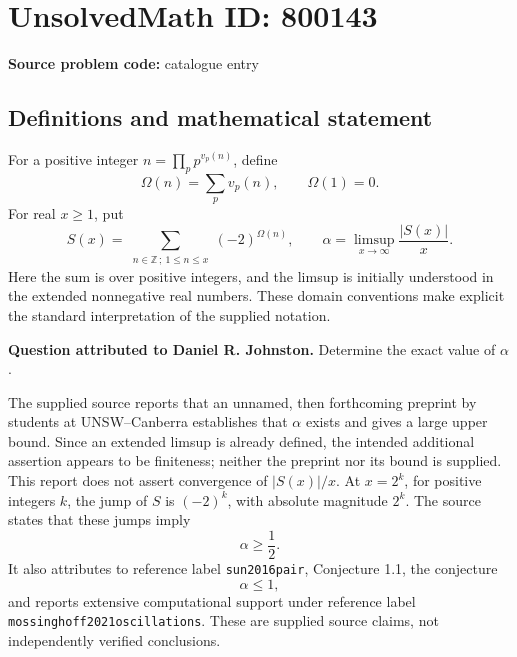 \documentclass[11pt]{article}
\newcommand{\Z}{\mathbb{Z}}
\begin{document}
\section*{UnsolvedMath ID: 800143}
\textbf{Source problem code:} catalogue entry
\subsection{Definitions and mathematical statement}
For a positive integer \(n=\prod_p p^{v_p(n)}\), define
\[
\Omega(n)=\sum_p v_p(n),\qquad \Omega(1)=0.
\]
For real \(x\geq 1\), put
\[
S(x)=\sum_{\substack{n\in\Z\,;\ 1\leq n\leq x}}(-2)^{\Omega(n)},
\qquad
\alpha=\limsup_{x\to\infty}\frac{|S(x)|}{x}.
\]
Here the sum is over positive integers, and the limsup is initially understood in the extended nonnegative real numbers. These domain conventions make explicit the standard interpretation of the supplied notation.

\textbf{Question attributed to Daniel R. Johnston.} Determine the exact value of \(\alpha\).

The supplied source reports that an unnamed, then forthcoming preprint by students at UNSW--Canberra establishes that \(\alpha\) exists and gives a large upper bound. Since an extended limsup is already defined, the intended additional assertion appears to be finiteness; neither the preprint nor its bound is supplied. This report does not assert convergence of \(|S(x)|/x\). At \(x=2^k\), for positive integers \(k\), the jump of \(S\) is \((-2)^k\), with absolute magnitude \(2^k\). The source states that these jumps imply
\[
\alpha\geq \frac12.
\]
It also attributes to reference label \texttt{sun2016pair}, Conjecture 1.1, the conjecture
\[
\alpha\leq 1,
\]
and reports extensive computational support under reference label \texttt{mossinghoff2021oscillations}. These are supplied source claims, not independently verified conclusions.
\end{document}
